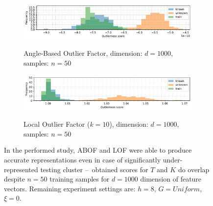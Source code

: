 \begin{figure}[tb]
    \vspace{-1.0em}
    \centering
    \begin{subfigure}[b]{\textwidth}
        \centering
        \caption{\small Angle-Based Outlier Factor, dimension: $d = 1000$, samples: $n = 50$}
        \includegraphics[width=\textwidth]{images/distributions/hists-extreme/hist-distributions-dimension_1000-samples_50-distance_8-distribution_uniform-model_ABOF-seed_0.pdf}
        \label{fig:hists-abof-n50}
    \end{subfigure}
    \begin{subfigure}[b]{\textwidth}
        \centering
        \caption{\small Local Outlier Factor ($k=10$), dimension: $d = 1000$, samples: $n = 50$}
        \includegraphics[width=\textwidth]{images/distributions/hists-extreme/hist-distributions-dimension_1000-samples_50-distance_8-distribution_uniform-model_LOF-10-seed_0.pdf}
        \label{fig:hists-lof-n50}
    \end{subfigure}
    \caption{In the performed study, ABOF and LOF were able to produce accurate representations even in case of significantly under-represented testing cluster –~obtained scores for $T$ and $K$ do overlap despite $n = 50$ training samples for $d = 1000$ dimension of feature vectors. Remaining experiment settings are: $h = 8$, $G = \textit{Uniform}$, $\xi = 0$.}
    \label{fig:hists-extreme-good}
    \vspace{-3.0em}
\end{figure}

